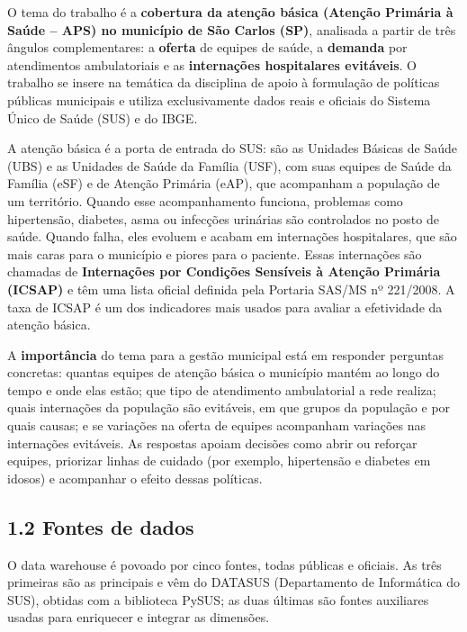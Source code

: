 \documentclass[12pt,a4paper]{article}
\begin{document}
O tema do trabalho é a \textbf{cobertura da atenção básica (Atenção Primária à Saúde – APS) no município de São Carlos (SP)}, analisada a partir de três ângulos complementares: a \textbf{oferta} de equipes de saúde, a \textbf{demanda} por atendimentos ambulatoriais e as \textbf{internações hospitalares evitáveis}. O trabalho se insere na temática da disciplina de apoio à formulação de políticas públicas municipais e utiliza exclusivamente dados reais e oficiais do Sistema Único de Saúde (SUS) e do IBGE.


A atenção básica é a porta de entrada do SUS: são as Unidades Básicas de Saúde (UBS) e as Unidades de Saúde da Família (USF), com suas equipes de Saúde da Família (eSF) e de Atenção Primária (eAP), que acompanham a população de um território. Quando esse acompanhamento funciona, problemas como hipertensão, diabetes, asma ou infecções urinárias são controlados no posto de saúde. Quando falha, eles evoluem e acabam em internações hospitalares, que são mais caras para o município e piores para o paciente. Essas internações são chamadas de \textbf{Internações por Condições Sensíveis à Atenção Primária (ICSAP)} e têm uma lista oficial definida pela Portaria SAS/MS nº 221/2008. A taxa de ICSAP é um dos indicadores mais usados para avaliar a efetividade da atenção básica.


A \textbf{importância} do tema para a gestão municipal está em responder perguntas concretas: quantas equipes de atenção básica o município mantém ao longo do tempo e onde elas estão; que tipo de atendimento ambulatorial a rede realiza; quais internações da população são evitáveis, em que grupos da população e por quais causas; e se variações na oferta de equipes acompanham variações nas internações evitáveis. As respostas apoiam decisões como abrir ou reforçar equipes, priorizar linhas de cuidado (por exemplo, hipertensão e diabetes em idosos) e acompanhar o efeito dessas políticas.


\FloatBarrier\subsection*{1.2 Fontes de dados}

O data warehouse é povoado por cinco fontes, todas públicas e oficiais. As três primeiras são as principais e vêm do DATASUS (Departamento de Informática do SUS), obtidas com a biblioteca PySUS; as duas últimas são fontes auxiliares usadas para enriquecer e integrar as dimensões.
\end{document}
